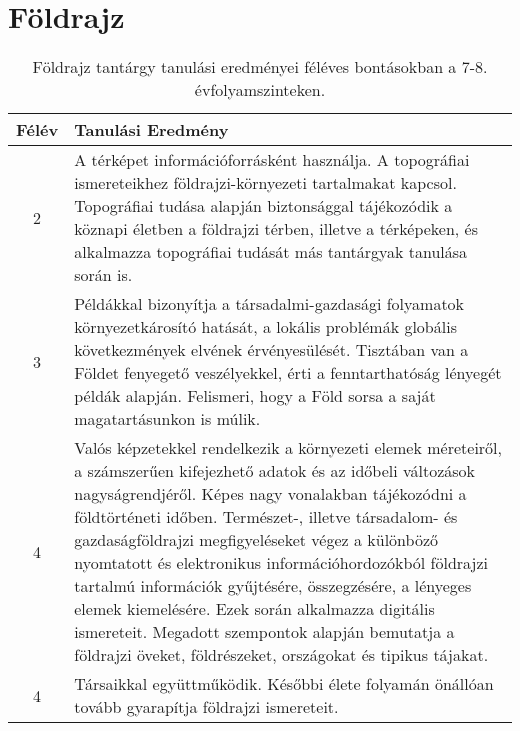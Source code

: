         \section{Földrajz}

       
           \begin{longtable}{c | p{} }
            \caption[Földrajz 7-8.]{Földrajz tantárgy tanulási eredményei féléves bontásokban a 7-8. évfolyamszinteken. }  \\

            \textbf{Félév} & \textbf{Tanulási Eredmény} \\
            \hline
            \endhead
                                
                                          2 &  A térképet információforrásként használja. A topográfiai ismereteikhez földrajzi-környezeti tartalmakat kapcsol. Topográfiai tudása alapján biztonsággal tájékozódik a köznapi életben a földrajzi térben, illetve a térképeken, és alkalmazza topográfiai tudását más tantárgyak tanulása során is. \\ \hline
                                      
                                
                                          3 &  Példákkal bizonyítja a társadalmi-gazdasági folyamatok környezetkárosító hatását, a lokális problémák globális következmények elvének érvényesülését. Tisztában van a Földet fenyegető veszélyekkel, érti a fenntarthatóság lényegét példák alapján. Felismeri, hogy a Föld sorsa a saját magatartásunkon is múlik. \\ \hline
                                      
                                
                                          4 &  Valós képzetekkel rendelkezik a környezeti elemek méreteiről, a számszerűen kifejezhető adatok és az időbeli változások nagyságrendjéről. Képes nagy vonalakban tájékozódni a földtörténeti időben. Természet-, illetve társadalom- és gazdaságföldrajzi megfigyeléseket végez a különböző nyomtatott és elektronikus információhordozókból földrajzi tartalmú információk gyűjtésére, összegzésére, a lényeges elemek kiemelésére. Ezek során alkalmazza digitális ismereteit. Megadott szempontok alapján bemutatja a földrajzi öveket, földrészeket, országokat és tipikus tájakat. \\ \hline
                                          4 &  Társaikkal együttműködik. Későbbi élete folyamán önállóan tovább gyarapítja földrajzi ismereteit. \\ \hline
                                      
                        \end{longtable}
            \clearpage

